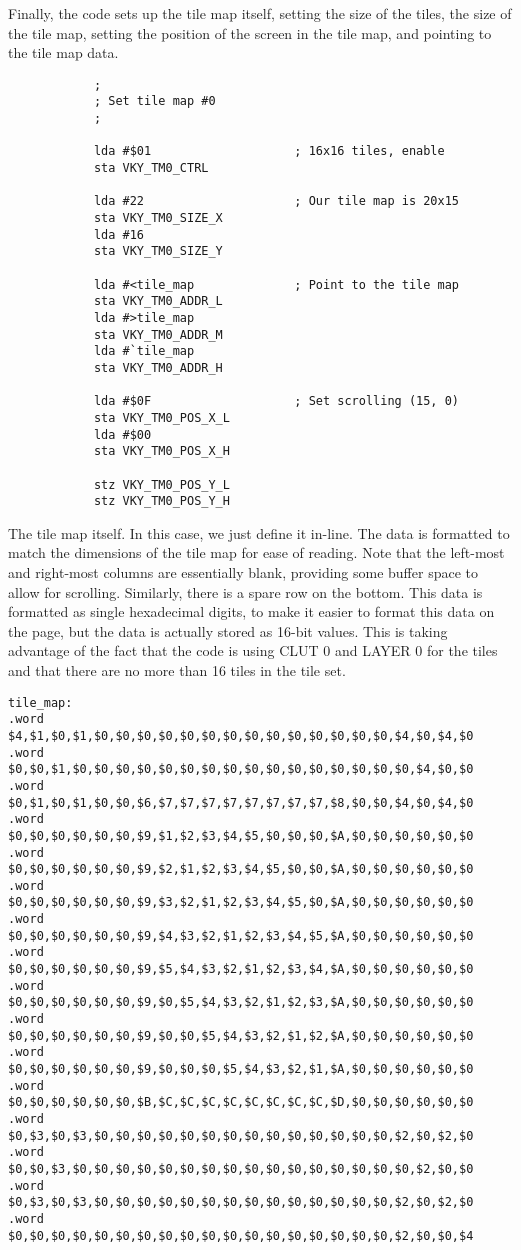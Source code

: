 Finally, the code sets up the tile map itself, setting the size of the tiles, the size of the tile map, setting the position of the screen in the tile map, and pointing to the tile map data.

\begin{verbatim}
            ;
            ; Set tile map #0
            ;

            lda #$01                    ; 16x16 tiles, enable
            sta VKY_TM0_CTRL

            lda #22                     ; Our tile map is 20x15
            sta VKY_TM0_SIZE_X
            lda #16
            sta VKY_TM0_SIZE_Y

            lda #<tile_map              ; Point to the tile map
            sta VKY_TM0_ADDR_L
            lda #>tile_map
            sta VKY_TM0_ADDR_M
            lda #`tile_map
            sta VKY_TM0_ADDR_H

            lda #$0F                    ; Set scrolling (15, 0)
            sta VKY_TM0_POS_X_L
            lda #$00
            sta VKY_TM0_POS_X_H

            stz VKY_TM0_POS_Y_L
            stz VKY_TM0_POS_Y_H
\end{verbatim}

The tile map itself. In this case, we just define it in-line. The data is formatted to match the dimensions of the tile map for ease of reading. Note that the left-most and right-most columns are essentially blank, providing some buffer space to allow for scrolling. Similarly, there is a spare row on the bottom. This data is formatted as single hexadecimal digits, to make it easier to format this data on the page, but the data is actually stored as 16-bit values. This is taking advantage of the fact that the code is using CLUT 0 and LAYER 0 for the tiles and that there are no more than 16 tiles in the tile set.

\begin{verbatim}
tile_map:
.word $4,$1,$0,$1,$0,$0,$0,$0,$0,$0,$0,$0,$0,$0,$0,$0,$0,$0,$4,$0,$4,$0
.word $0,$0,$1,$0,$0,$0,$0,$0,$0,$0,$0,$0,$0,$0,$0,$0,$0,$0,$0,$4,$0,$0
.word $0,$1,$0,$1,$0,$0,$6,$7,$7,$7,$7,$7,$7,$7,$7,$8,$0,$0,$4,$0,$4,$0
.word $0,$0,$0,$0,$0,$0,$9,$1,$2,$3,$4,$5,$0,$0,$0,$A,$0,$0,$0,$0,$0,$0
.word $0,$0,$0,$0,$0,$0,$9,$2,$1,$2,$3,$4,$5,$0,$0,$A,$0,$0,$0,$0,$0,$0
.word $0,$0,$0,$0,$0,$0,$9,$3,$2,$1,$2,$3,$4,$5,$0,$A,$0,$0,$0,$0,$0,$0
.word $0,$0,$0,$0,$0,$0,$9,$4,$3,$2,$1,$2,$3,$4,$5,$A,$0,$0,$0,$0,$0,$0
.word $0,$0,$0,$0,$0,$0,$9,$5,$4,$3,$2,$1,$2,$3,$4,$A,$0,$0,$0,$0,$0,$0
.word $0,$0,$0,$0,$0,$0,$9,$0,$5,$4,$3,$2,$1,$2,$3,$A,$0,$0,$0,$0,$0,$0
.word $0,$0,$0,$0,$0,$0,$9,$0,$0,$5,$4,$3,$2,$1,$2,$A,$0,$0,$0,$0,$0,$0
.word $0,$0,$0,$0,$0,$0,$9,$0,$0,$0,$5,$4,$3,$2,$1,$A,$0,$0,$0,$0,$0,$0
.word $0,$0,$0,$0,$0,$0,$B,$C,$C,$C,$C,$C,$C,$C,$C,$D,$0,$0,$0,$0,$0,$0
.word $0,$3,$0,$3,$0,$0,$0,$0,$0,$0,$0,$0,$0,$0,$0,$0,$0,$0,$2,$0,$2,$0
.word $0,$0,$3,$0,$0,$0,$0,$0,$0,$0,$0,$0,$0,$0,$0,$0,$0,$0,$0,$2,$0,$0
.word $0,$3,$0,$3,$0,$0,$0,$0,$0,$0,$0,$0,$0,$0,$0,$0,$0,$0,$2,$0,$2,$0
.word $0,$0,$0,$0,$0,$0,$0,$0,$0,$0,$0,$0,$0,$0,$0,$0,$0,$0,$2,$0,$0,$4
\end{verbatim}
